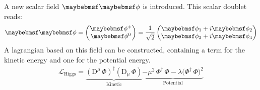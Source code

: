 A new scalar field $\scalarField$ is introduced. This scalar doublet reads: \\
\begin{gather}
\scalarField =  \begin{pmatrix} \phi^+ \\ \phi^0 \end{pmatrix} = \frac{1}{\sqrt{2}} \begin{pmatrix}  \phi_1 + i \phi_2 \\ \phi_3 + i \phi_4\end{pmatrix}
\end{gather}
A lagrangian based on this field can be constructed, containing a term for the kinetic energy and one for the potential energy.
\begin{gather}
    \label{eq_lagrangian_higgs}
    \mathcal{L}_\mathrm{Higgs} = \underbrace{(\mathrm{D}\xspace^\mu \, \Phi)^\dagger (\mathrm{D}\xspace_\mu \, \Phi)}_{\text{Kinetic}} \underbrace{- \mu^2 \, \Phi^\dagger \, \Phi - \lambda {(\Phi^\dagger \, \Phi})^2}_{\text{Potential}}
\end{gather}

